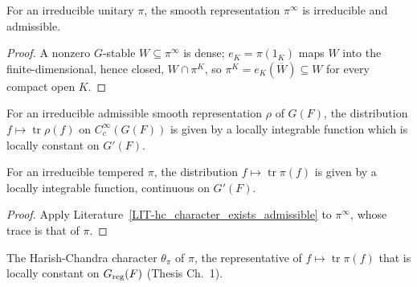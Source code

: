 \begin{theorem}
\label{smoothRep_isIrreducible_isAdmissible}
\leanok
{}
For an irreducible unitary $\pi$, the smooth representation $\pi^\infty$ is irreducible and admissible.
\end{theorem}
\begin{proof}
\leanok
A nonzero $G$-stable $W\subseteq\pi^\infty$ is dense; $e_K=\pi(1_K)$ maps $W$ into the finite-dimensional,
hence closed, $W\cap\pi^K$, so $\pi^K=e_K(\overline W)\subseteq W$ for every compact open $K$.
\end{proof}

\begin{literature}
\label{LIT-hc_character_exists_admissible}
\leanok
{}
For an irreducible admissible smooth representation $\rho$ of $G(F)$, the distribution
$f\mapsto\operatorname{tr}\rho(f)$ on $C_c^\infty(G(F))$ is given by a locally integrable function which is
locally constant on $G'(F)$.

\end{literature}

\begin{theorem}
\label{hc_character_exists}
\leanok
{}
For an irreducible tempered $\pi$, the distribution $f\mapsto\operatorname{tr}\pi(f)$ is given by a locally
integrable function, continuous on $G'(F)$.
\end{theorem}
\begin{proof}
\leanok
Apply Literature~\ref{LIT-hc_character_exists_admissible} to $\pi^\infty$, whose trace is that of $\pi$.
\end{proof}

\begin{definition}
\label{charG}
\leanok
{}
The Harish-Chandra character $\theta_\pi$ of $\pi$, the representative of $f\mapsto\operatorname{tr}\pi(f)$
that is locally constant on $G_{\mathrm{reg}}(F)$ (Thesis Ch.~1).
\end{definition}

